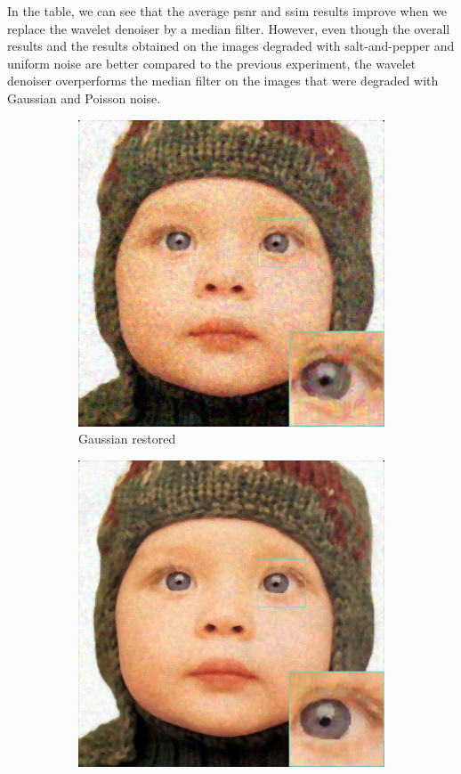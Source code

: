 In the table, we can see that the average \gls{psnr} and \gls{ssim} results improve when we replace the wavelet denoiser by a median filter. However, even though the overall results and the results obtained on the images degraded with salt-and-pepper and uniform noise are better compared to the previous experiment, the wavelet denoiser overperforms the median filter on the images that were degraded with Gaussian and Poisson noise.

\begin{figure}
	\centering
	\begin{subfigure}{0.24\textwidth}
		\includegraphics[width=\textwidth]{images/exp2.3/gaussian.png}
		\caption{Gaussian restored}
	\end{subfigure}
	\begin{subfigure}{0.24\textwidth}
		\includegraphics[width=\textwidth]{images/exp2.3/poisson.png}

\end{subfigure}
\end{figure}
